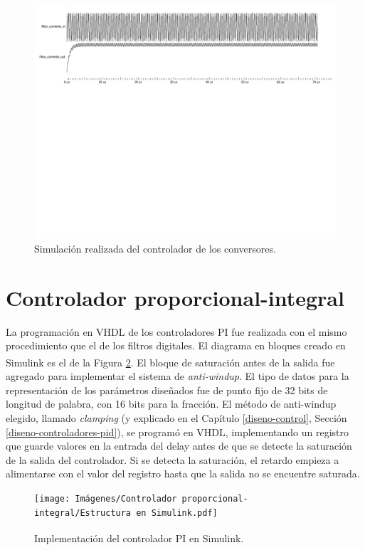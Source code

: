 \begin{figure}[hbt!]
    \centering
    \includegraphics[width=0.85\columnwidth]{Imágenes/Filtro digital/Simulación en ModelSim.pdf}    
    \caption{Simulación realizada del controlador de los conversores.}
    \label{simulacion-filtro}
\end{figure} 

\section{Controlador proporcional-integral}
\label{implementacion-pid}

La programación en VHDL de los controladores PI fue realizada con el mismo procedimiento que el de los filtros digitales. El diagrama en bloques creado en Simulink\textsuperscript\textregistered \hspace{0.6pt} es el de la Figura \ref{estructura-pi}. El bloque de saturación antes de la salida fue agregado para implementar el sistema de \emph{anti-windup}. El tipo de datos para la representación de los parámetros diseñados fue de punto fijo de 32 bits de longitud de palabra, con 16 bits para la fracción. El método de anti-windup elegido, llamado \emph{clamping} (y explicado en el Capítulo \ref{diseno-control}, Sección \ref{diseno-controladores-pid}), se programó en VHDL, implementando un registro que guarde valores en la entrada del delay antes de que se detecte la saturación de la salida del controlador. Si se detecta la saturación, el retardo empieza a alimentarse con el valor del registro hasta que la salida no se encuentre saturada.

\begin{figure}[hbt!]
    \centering
    \texttt{[image: Imágenes/Controlador proporcional-integral/Estructura en Simulink.pdf]}    
    \caption{Implementación del controlador PI en Simulink\textsuperscript\textregistered.}
    \label{estructura-pi}
\end{figure}

